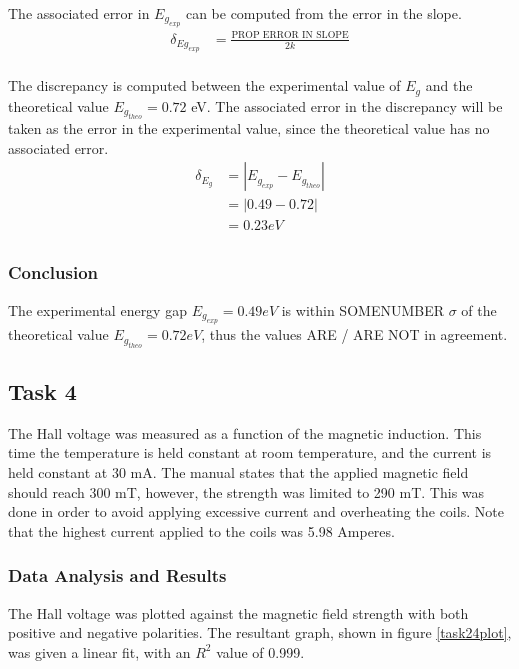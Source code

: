 \documentclass[a4paper]{article}
\begin{document}
The associated error in $E_{g_{exp}}$ can be computed from the error in the slope.
\begin{align*}
\delta_{Eg_{exp}} &= \frac{\text{PROP ERROR IN SLOPE}}{2k} \\
		
\end{align*}

\qq The discrepancy is computed between the experimental value of
$E_g$ and the theoretical value $E_{g_{theo}} = 0.72$ eV. The
associated error in the discrepancy will be taken as the error in the
experimental value, since the theoretical value has no associated
error.
\begin{align*}
\delta_{E_g} &= | E_{g_{exp}} - E_{g_{theo}} | \\
		     &= | 0.49 - 0.72 | \\
		     &= 0.23 eV \\
\end{align*}

\subsubsection{Conclusion}
\qq The experimental energy gap $E_{g_{exp}} = 0.49 eV$ is within
SOMENUMBER $\sigma$ of the theoretical value $E_{g_{theo}} = 0.72 eV$,
thus the values ARE / ARE NOT in agreement.

\subsection{Task 4}

\qq The Hall voltage was measured as a function of the magnetic
induction. This time the temperature is held constant at room
temperature, and the current is held constant at 30 mA. The manual
states that the applied magnetic field should reach 300 mT,
however, the strength was limited to 290 mT. This was done in
order to avoid applying excessive current and overheating the coils. 
Note that the highest current applied to the coils was 5.98
Amperes.

\subsubsection{Data Analysis and Results}
\qq The Hall voltage was plotted against the magnetic field strength
with both positive and negative polarities. The resultant graph, shown
in figure \ref{task24plot}, was given a linear fit, with an $R^2$
value of 0.999.
\end{document}
